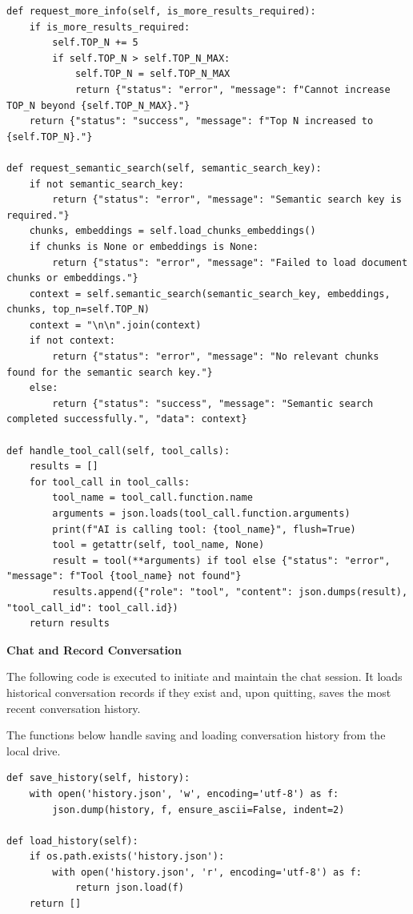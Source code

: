 \begin{lstlisting}
def request_more_info(self, is_more_results_required):
    if is_more_results_required:
        self.TOP_N += 5
        if self.TOP_N > self.TOP_N_MAX:
            self.TOP_N = self.TOP_N_MAX
            return {"status": "error", "message": f"Cannot increase TOP_N beyond {self.TOP_N_MAX}."}
    return {"status": "success", "message": f"Top N increased to {self.TOP_N}."}

def request_semantic_search(self, semantic_search_key):
    if not semantic_search_key:
        return {"status": "error", "message": "Semantic search key is required."}
    chunks, embeddings = self.load_chunks_embeddings()
    if chunks is None or embeddings is None:
        return {"status": "error", "message": "Failed to load document chunks or embeddings."}
    context = self.semantic_search(semantic_search_key, embeddings, chunks, top_n=self.TOP_N)
    context = "\n\n".join(context)
    if not context:
        return {"status": "error", "message": "No relevant chunks found for the semantic search key."}
    else:
        return {"status": "success", "message": "Semantic search completed successfully.", "data": context}
        
def handle_tool_call(self, tool_calls):
    results = []
    for tool_call in tool_calls:
        tool_name = tool_call.function.name
        arguments = json.loads(tool_call.function.arguments)
        print(f"AI is calling tool: {tool_name}", flush=True)
        tool = getattr(self, tool_name, None)
        result = tool(**arguments) if tool else {"status": "error", "message": f"Tool {tool_name} not found"}
        results.append({"role": "tool", "content": json.dumps(result), "tool_call_id": tool_call.id})
    return results
\end{lstlisting}

\vspace{0.1in}
\noindent \textbf{Chat and Record Conversation} \label{sec:agenticaiexp-manual}
\vspace{0.1in}

The following code is executed to initiate and maintain the chat session. It loads historical conversation records if they exist and, upon quitting, saves the most recent conversation history.

The functions below handle saving and loading conversation history from the local drive.

\begin{lstlisting}
def save_history(self, history):
    with open('history.json', 'w', encoding='utf-8') as f:
        json.dump(history, f, ensure_ascii=False, indent=2)

def load_history(self):
    if os.path.exists('history.json'):
        with open('history.json', 'r', encoding='utf-8') as f:
            return json.load(f)
    return []
\end{lstlisting}

